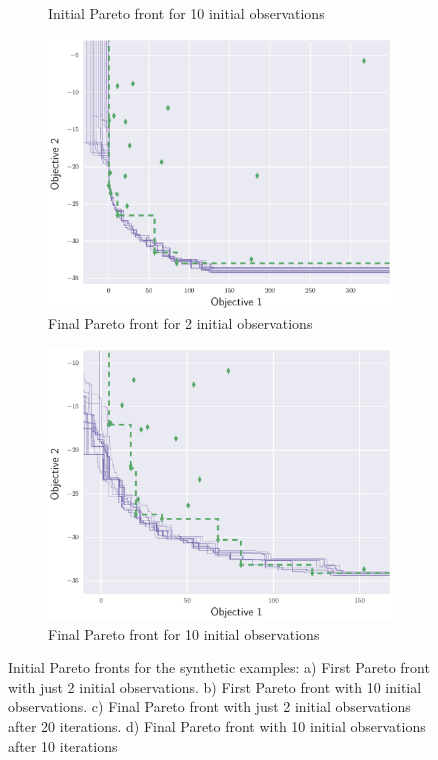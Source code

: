 \documentclass{article}
\begin{document}
\begin{figure}[!t]
\begin{subfigure}{0.45\textwidth}
        \caption{Initial Pareto front for 10 initial observations}
        \label{hi_intial}
    \end{subfigure}
    \hfill
    \begin{subfigure}{0.45\textwidth}
        \includegraphics[width=\textwidth]{li_ex1_19}
        \caption{Final Pareto front for 2 initial observations}
        \label{li_final}
    \end{subfigure}
    \hfill
    \begin{subfigure}{0.45\textwidth}
        \includegraphics[width=\textwidth]{hi_ex1_09}
        \caption{Final Pareto front for 10 initial observations}
        \label{hi_final}
    \end{subfigure}
\caption{Initial Pareto fronts for the synthetic examples: a) First Pareto front with just 2 initial observations. b) First Pareto front with 10 initial observations. c) Final Pareto front with just 2 initial observations after 20 iterations. d) Final Pareto front with 10 initial observations after 10 iterations}
\label{fronts}
\end{figure}
\end{document}
